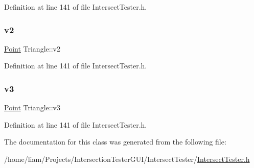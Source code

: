 Definition at line 141 of file Intersect\+Tester.\+h.

\mbox{\label{class_triangle_a23721a1b58e5e427c1ac65e311e2828d}} 
\subsubsection{\texorpdfstring{v2}{v2}}
{\footnotesize\ttfamily \hyperlink{class_point}{Point} Triangle\+::v2}



Definition at line 141 of file Intersect\+Tester.\+h.

\mbox{\label{class_triangle_a9ffab42f55ebdbaa549cb1cc592b1c76}} 
\subsubsection{\texorpdfstring{v3}{v3}}
{\footnotesize\ttfamily \hyperlink{class_point}{Point} Triangle\+::v3}



Definition at line 141 of file Intersect\+Tester.\+h.



The documentation for this class was generated from the following file\+:\begin{DoxyCompactItemize}
\item 
/home/liam/\+Projects/\+Intersection\+Tester\+G\+U\+I/\+Intersect\+Tester/\hyperlink{_intersect_tester_8h}{Intersect\+Tester.\+h}\end{DoxyCompactItemize}
